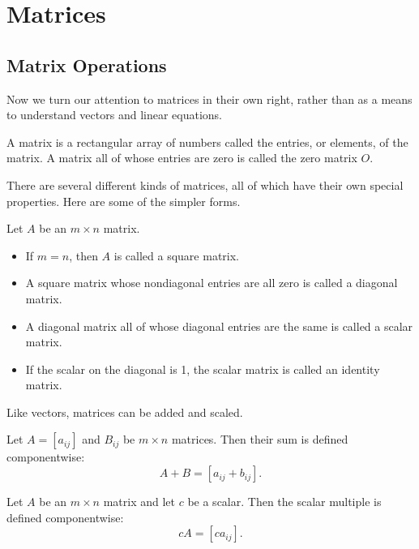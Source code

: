 \documentclass[../m073main.tex]{subfiles}
\begin{document}
\chapter{Matrices}

\section{Matrix Operations}
Now we turn our attention to matrices in their own right, rather than as a means to understand vectors and linear equations.

\begin{definition}[Matrix]
	A matrix is a rectangular array of numbers called the entries, or elements, of the matrix.
	A matrix all of whose entries are zero is called the zero matrix $O$.
\end{definition}

There are several different kinds of matrices, all of which have their own special properties.
Here are some of the simpler forms.

\begin{definition}
	Let $A$ be an $m \times n$ matrix.
	\begin{itemize}
		\item If $ m =n$, then $A$ is called a square matrix.
		\item A square matrix whose nondiagonal entries are all zero is called a diagonal matrix.
		\item A diagonal matrix all of whose diagonal entries are the same is called a scalar matrix.
		\item If the scalar on the diagonal is 1, the scalar matrix is called an identity matrix.
	\end{itemize}
\end{definition}

Like vectors, matrices can be added and scaled.

\begin{definition}
	Let $A = [a_{ij}]$ and $B_{ij}$ be $m \times n$ matrices.
	Then their sum is defined componentwise:
	\[ A + B = [a_{ij} + b_{ij}]. \]
\end{definition}

\begin{definition}
	Let $A$ be an $m\times n$ matrix and let $c$ be a scalar.
	Then the scalar multiple is defined componentwise:
	\[ cA = [ca_{ij}]. \]
\end{definition}
\end{document}
